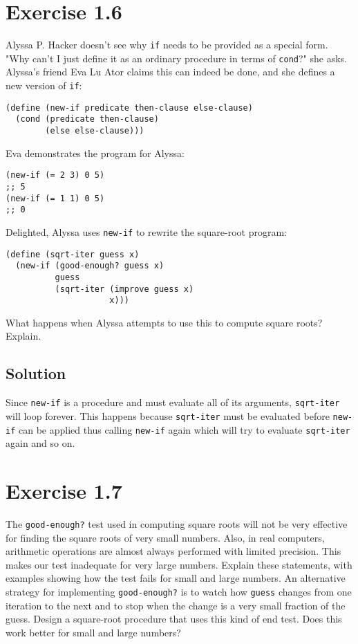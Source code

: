 \documentclass[11pt]{article}
\begin{document}
\section{Exercise 1.6}
\label{sec:org27f050c}
Alyssa P. Hacker doesn't see why \texttt{if} needs to be provided as a special
form. "Why can't I just define it as an ordinary procedure in terms of
\texttt{cond}?" she asks. Alyssa's friend Eva Lu Ator claims this can indeed be
done, and she defines a new version of \texttt{if}:
\begin{verbatim}
(define (new-if predicate then-clause else-clause)
  (cond (predicate then-clause)
        (else else-clause)))
\end{verbatim}
Eva demonstrates the program for Alyssa:
\begin{verbatim}
(new-if (= 2 3) 0 5)
;; 5
(new-if (= 1 1) 0 5)
;; 0
\end{verbatim}
Delighted, Alyssa uses \texttt{new-if} to rewrite the square-root program:
\begin{verbatim}
(define (sqrt-iter guess x)
  (new-if (good-enough? guess x)
          guess
          (sqrt-iter (improve guess x)
                     x)))
\end{verbatim}
What happens when Alyssa attempts to use this to compute square roots?
Explain.
\subsection{Solution}
\label{sec:org76cda86}
Since \texttt{new-if} is a procedure and must evaluate all of its arguments,
\texttt{sqrt-iter} will loop forever. This happens because \texttt{sqrt-iter} must be
evaluated before \texttt{new-if} can be applied thus calling \texttt{new-if} again
which will try to evaluate \texttt{sqrt-iter} again and so on.

\section{Exercise 1.7}
\label{sec:org5bd7930}
The \texttt{good-enough?} test used in computing square roots will not be very
effective for finding the square roots of very small numbers. Also, in
real computers, arithmetic operations are almost always performed with
limited precision. This makes our test inadequate for very large
numbers. Explain these statements, with examples showing how the test
fails for small and large numbers. An alternative strategy for
implementing \texttt{good-enough?} is to watch how \texttt{guess} changes from one
iteration to the next and to stop when the change is a very small
fraction of the guess. Design a square-root procedure that uses this
kind of end test. Does this work better for small and large numbers?
\end{document}
